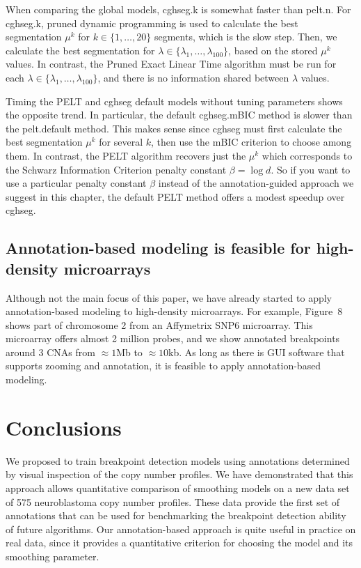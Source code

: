\documentclass[10pt]{bmc_article}
\newenvironment{bmcformat}{\begin{raggedright}\baselineskip20pt\sloppy\setboolean{publ}{false}}{\end{raggedright}\baselineskip20pt\sloppy}
\begin{document}
\begin{bmcformat}
When comparing the global models, cghseg.k is somewhat faster than
pelt.n. For cghseg.k, pruned dynamic programming is used to calculate
the best segmentation $\mu^k$ for $k\in\{1,\dots,20\}$ segments, which
is the slow step. Then, we calculate the best segmentation for
$\lambda\in\{\lambda_1,\dots,\lambda_{100}\}$, based on the stored
$\mu^k$ values. In contrast, the Pruned Exact Linear Time algorithm
must be run for each $\lambda\in\{\lambda_1,\dots,\lambda_{100}\}$,
and there is no information shared between $\lambda$ values.

Timing the PELT and cghseg default models without tuning
parameters shows the opposite trend. In particular, the default
cghseg.mBIC method is slower than the pelt.default method. This makes
sense since cghseg must first calculate the best segmentation $\mu^k$
for several $k$, then use the mBIC criterion to choose among them. In
contrast, the PELT algorithm recovers just the $\mu^k$ which
corresponds to the Schwarz Information Criterion penalty constant
$\beta=\log d$. So if you want to use a particular penalty constant
$\beta$ instead of the annotation-guided approach we suggest in this
chapter, the default PELT method offers a modest speedup over cghseg.

\subsection*{Annotation-based modeling is feasible for high-density
  microarrays}

Although not the main focus of this paper, we have already started to
apply annotation-based modeling to high-density microarrays. For
example, Figure~8 shows part of chromosome 2 from an Affymetrix SNP6
microarray. This microarray offers almost 2 million probes, and we
show annotated breakpoints around 3 CNAs from $\approx 1$Mb to
$\approx 10$kb. As long as there is GUI software that supports zooming
and annotation, it is feasible to apply annotation-based modeling.


\section*{Conclusions}

We proposed to train breakpoint detection models using annotations
determined by visual inspection of the copy number profiles. We have
demonstrated that this approach allows quantitative comparison of
smoothing models on a new data set of 575 neuroblastoma copy number
profiles. These data provide the first set of annotations that can be
used for benchmarking the breakpoint detection ability of future
algorithms. Our annotation-based approach is quite useful in practice
on real data, since it provides a quantitative criterion for choosing
the model and its smoothing parameter. 


\end{bmcformat}
\end{document}
